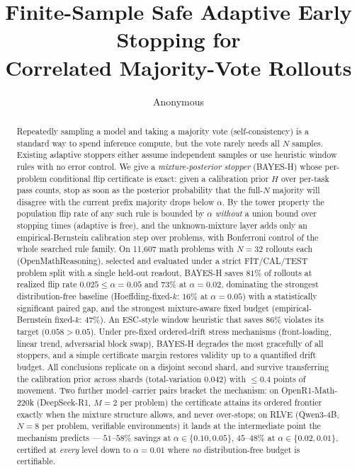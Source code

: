 \documentclass{article}
\title{Finite-Sample Safe Adaptive Early Stopping for\\
Correlated Majority-Vote Rollouts}
\author{Anonymous}
\date{}
\theoremstyle{definition}
\theoremstyle{remark}
\begin{document}
\maketitle

\begin{abstract}
Repeatedly sampling a model and taking a majority vote (self-consistency) is a
standard way to spend inference compute, but the vote rarely needs all $N$
samples. Existing adaptive stoppers either assume independent samples or use
heuristic window rules with no error control. We give a
\emph{mixture-posterior stopper} (BAYES-H) whose per-problem conditional flip
certificate is exact: given a calibration prior $H$ over per-task pass counts,
stop as soon as the posterior probability that the full-$N$ majority will
disagree with the current prefix majority drops below $\alpha$. By the tower
property the population flip rate of any such rule is bounded by $\alpha$
\emph{without} a union bound over stopping times (adaptive is free), and the
unknown-mixture layer adds only an empirical-Bernstein calibration step over
problems, with Bonferroni control of the whole searched rule family.
On 11{,}607 math problems with $N=32$ rollouts each (OpenMathReasoning),
selected and evaluated under a strict FIT/CAL/TEST problem split with a single
held-out readout, BAYES-H saves $81\%$ of rollouts at realized flip rate
$0.025\le\alpha=0.05$ and $73\%$ at $\alpha=0.02$, dominating the strongest
distribution-free baseline (Hoeffding-fixed-$k$: $16\%$ at $\alpha=0.05$) with
a statistically significant paired gap, and the strongest mixture-aware fixed
budget (empirical-Bernstein fixed-$k$: $47\%$). An ESC-style window heuristic
that saves $86\%$ violates its target ($0.058>0.05$). Under pre-fixed
ordered-drift stress mechanisms (front-loading, linear trend, adversarial
block swap), BAYES-H degrades the most gracefully of all stoppers, and a
simple certificate margin restores validity up to a quantified drift budget.
All conclusions replicate on a disjoint second shard, and survive transferring
the calibration prior across shards (total-variation $0.042$) with $\le0.4$
points of movement. Two further model--carrier pairs bracket the mechanism:
on OpenR1-Math-220k (DeepSeek-R1, $M=2$ per problem) the certificate attains
its ordered frontier exactly when the mixture structure allows, and never
over-stops; on RLVE (Qwen3-4B, $N=8$ per problem, verifiable environments) it
lands at the intermediate point the mechanism predicts --- $51$--$58\%$
savings at $\alpha\in\{0.10,0.05\}$, $45$--$48\%$ at
$\alpha\in\{0.02,0.01\}$, certified at \emph{every} level down to
$\alpha=0.01$ where \emph{no} distribution-free budget is certifiable.
\end{abstract}
\end{document}
